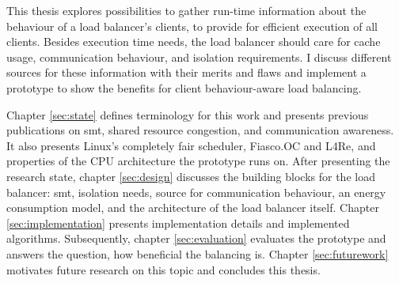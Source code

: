 This thesis explores possibilities to gather run-time information about the
behaviour of a load balancer's clients, to provide for efficient execution of
all clients.
Besides execution time needs, the load balancer should care for cache usage,
communication behaviour, and isolation requirements.
I discuss different sources for these information with their merits and flaws and
implement a prototype to show the benefits for client behaviour-aware load
balancing.

Chapter \ref{sec:state} defines terminology for this work and presents previous
publications on \gls{smt}, shared resource congestion, and communication awareness.
It also presents Linux's completely fair scheduler, Fiasco.OC and L4Re, and
properties of the CPU architecture the prototype runs on.
After presenting the research state, chapter \ref{sec:design} discusses 
the building blocks for the load
balancer: \gls{smt}, isolation needs, source for communication behaviour, an energy
consumption model, and the architecture of the load balancer itself.
Chapter \ref{sec:implementation} presents implementation details and
implemented algorithms.
Subsequently, chapter \ref{sec:evaluation} evaluates the prototype and answers
the question, how beneficial the balancing is.
Chapter \ref{sec:futurework} motivates future research on this topic and
concludes this thesis.


\cleardoublepage

